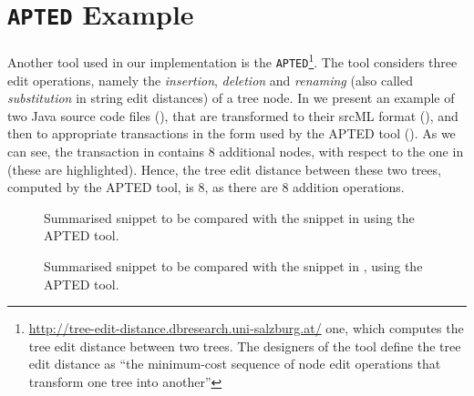 \section{\texttt{APTED} Example}
\label{sec:apted}

Another tool used in our implementation is the \texttt{APTED}\footnote{\url{http://tree-edit-distance.dbresearch.uni-salzburg.at/} one, which computes the tree edit distance between two trees. The designers of the tool define the tree edit distance as ``the minimum-cost sequence of node edit operations that transform one tree into another''}. The tool considers three edit operations, namely the \textit{insertion}, \textit{deletion} and \textit{renaming} (also called \textit{substitution} in string edit distances) of a tree node. In  we present an example of two Java source code files (), that are transformed to their srcML format (), and then to appropriate transactions in the form used by the APTED tool (). As we can see, the transaction in  contains 8 additional nodes, with respect to the one in  (these are highlighted). Hence, the tree edit distance between these two trees, computed by the APTED tool, is 8, as there are 8 addition operations.

\begin{figure}[h]

\vspace{-10pt}
\caption[Summarised snippet to be compared with the snippet in , using the APTED tool]{Summarised snippet to be compared with the snippet in  using the APTED tool.}
\label{listings:apted1-java}
\end{figure}

\begin{figure}[h]

\vspace{-10pt}
\caption[Summarised snippet to be compared with the snippet in , using the APTED tool]{Summarised snippet to be compared with the snippet in , using the APTED tool.}
\label{listings:apted2-java}
\end{figure}
\vspace{-10pt}

